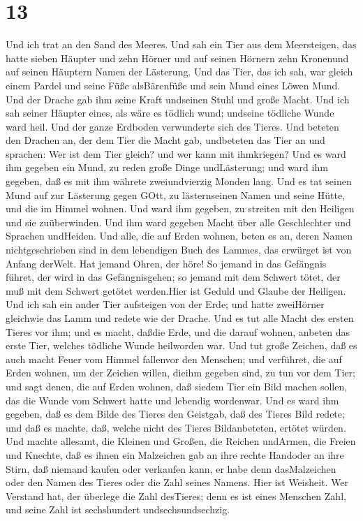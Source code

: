 \hypertarget{section-11}{%
\section{13}\label{section-11}}

 Und ich trat an den Sand des Meeres. Und sah ein Tier aus
dem Meersteigen, das hatte sieben Häupter und zehn Hörner und auf seinen
Hörnern zehn Kronenund auf seinen Häuptern Namen der Lästerung.
 Und das Tier, das ich sah, war gleich einem Pardel und
seine Füße alsBärenfüße und sein Mund eines Löwen Mund. Und der Drache
gab ihm seine Kraft undseinen Stuhl und große Macht.  Und
ich sah seiner Häupter eines, als wäre es tödlich wund; undseine
tödliche Wunde ward heil. Und der ganze Erdboden verwunderte sich des
Tieres.  Und beteten den Drachen an, der dem Tier die Macht
gab, undbeteten das Tier an und sprachen: Wer ist dem Tier gleich? und
wer kann mit ihmkriegen?  Und es ward ihm gegeben ein Mund,
zu reden große Dinge undLästerung; und ward ihm gegeben, daß es mit ihm
währete zweiundvierzig Monden lang.  Und es tat seinen Mund
auf zur Lästerung gegen GOtt, zu lästernseinen Namen und seine Hütte,
und die im Himmel wohnen.  Und ward ihm gegeben, zu streiten
mit den Heiligen und sie zuüberwinden. Und ihm ward gegeben Macht über
alle Geschlechter und Sprachen undHeiden.  Und alle, die auf
Erden wohnen, beten es an, deren Namen nichtgeschrieben sind in dem
lebendigen Buch des Lammes, das erwürget ist von Anfang derWelt.
 Hat jemand Ohren, der höre!  So jemand in das
Gefängnis führet, der wird in das Gefängnisgehen; so jemand mit dem
Schwert tötet, der muß mit dem Schwert getötet werden.Hier ist Geduld
und Glaube der Heiligen.  Und ich sah ein ander Tier
aufsteigen von der Erde; und hatte zweiHörner gleichwie das Lamm und
redete wie der Drache.  Und es tut alle Macht des ersten
Tieres vor ihm; und es macht, daßdie Erde, und die darauf wohnen,
anbeten das erste Tier, welches tödliche Wunde heilworden war.
 Und tut große Zeichen, daß es auch macht Feuer vom Himmel
fallenvor den Menschen;  und verführet, die auf Erden
wohnen, um der Zeichen willen, dieihm gegeben sind, zu tun vor dem Tier;
und sagt denen, die auf Erden wohnen, daß siedem Tier ein Bild machen
sollen, das die Wunde vom Schwert hatte und lebendig wordenwar.
 Und es ward ihm gegeben, daß es dem Bilde des Tieres den
Geistgab, daß des Tieres Bild redete; und daß es machte, daß, welche
nicht des Tieres Bildanbeteten, ertötet würden.  Und machte
allesamt, die Kleinen und Großen, die Reichen undArmen, die Freien und
Knechte, daß es ihnen ein Malzeichen gab an ihre rechte Handoder an ihre
Stirn,  daß niemand kaufen oder verkaufen kann, er habe
denn dasMalzeichen oder den Namen des Tieres oder die Zahl seines
Namens.  Hier ist Weisheit. Wer Verstand hat, der überlege
die Zahl desTieres; denn es ist eines Menschen Zahl, und seine Zahl ist
sechshundert undsechsundsechzig.

